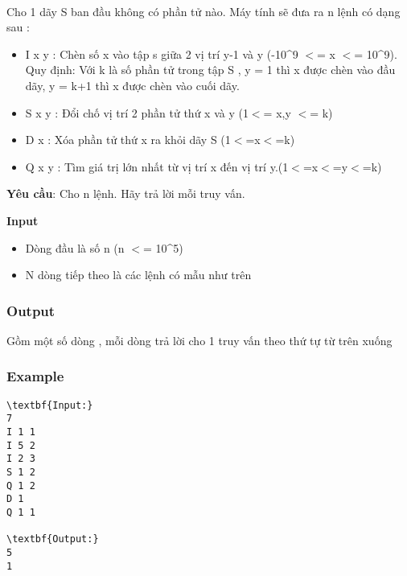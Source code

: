 

 

Cho 1 dãy S ban đầu không có phần tử nào. Máy tính sẽ đưa ra n lệnh có dạng sau :
\begin{itemize}
	\item I x y : Chèn số x vào tập s giữa 2 vị trí y-1 và y (-10\textasciicircum9 $<$= x $<$= 10\textasciicircum9). Quy định: Với k là số phần tử trong tập S , y = 1 thì x được chèn vào đầu dãy, y = k+1 thì x được chèn vào cuối dãy.
	\item S x y : Đổi chố vị trí 2 phần tử thứ x và y (1$<$= x,y $<$= k)
	\item D x : Xóa phần tử thứ x ra khỏi dãy S (1$<$=x$<$=k)
	\item Q x y : Tìm giá trị lớn nhất từ vị trí x đến vị trí y.(1$<$=x$<$=y$<$=k)
\end{itemize}

\textbf{Yêu cầu}: Cho n lệnh. Hãy trả lời mỗi truy vấn.

\textbf{Input}
\begin{itemize}
	\item Dòng đầu là số n (n $<$= 10\textasciicircum5)
	\item N dòng tiếp theo là các lệnh có mẫu như trên
\end{itemize}

\subsubsection{Output}

Gồm một số dòng , mỗi dòng trả lời cho 1 truy vấn theo thứ tự từ trên xuống

\subsubsection{Example}
\begin{verbatim}
\textbf{Input:}
7
I 1 1
I 5 2
I 2 3
S 1 2
Q 1 2
D 1
Q 1 1

\textbf{Output:}
5
1\end{verbatim}